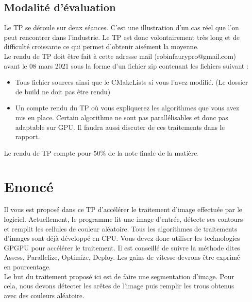 \documentclass{article}
\begin{document}
\subsection{Modalité d'évaluation}
Le TP se déroule sur deux séances. C'est une illustration d'un cas réel que l'on peut rencontrer dans l'industrie. Le TP est donc volontairement très long et de difficulté croissante ce qui permet d'obtenir aisément la moyenne.\\
Le rendu de TP doit être fait à cette adresse mail (robinfaurypro@gmail.com) avant le 08 mars 2021 sous la forme d'un fichier zip contenant les fichiers suivant :
\begin{itemize}
	\item Tous fichier sources ainsi que le CMakeLists si vous l'avez modifié. (Le dossier de build ne doit pas être rendu)
	\item Un compte rendu du TP où vous expliquerez les algorithmes que vous avez mis en place. Certain algorithme ne sont pas parallélisables et donc pas adaptable sur GPU. Il faudra aussi discuter de ces traitements dans le rapport.
\end{itemize}
Le rendu de TP compte pour 50\% de la note finale de la matière.

\section{Enoncé}
Il vous est proposé dans ce TP d'accélérer le traitement d'image effectuée par le logiciel. Actuellement, le programme lit une image d'entrée, détecte ses contours et remplit les cellules de couleur aléatoire. Tous les algorithmes de traitements d'images sont déjà développé en CPU. Vous devez donc utiliser les technologies GPGPU pour accélérer le traitement. Il est conseillé de suivre la méthode dites Assess, Parallelize, Optimize, Deploy. Les gains de vitesse devrons être exprimé en pourcentage.\\
Le but du traitement proposé ici est de faire une segmentation d'image. Pour cela, nous devons détecter les arêtes de l'image puis remplir les trous obtenus avec des couleurs aléatoire.
\end{document}
